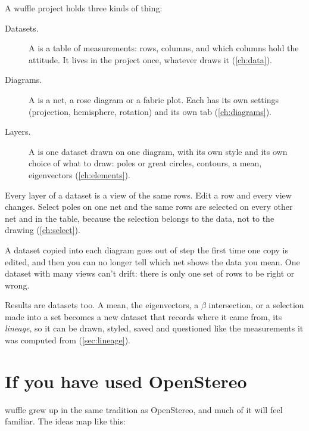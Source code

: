 A wuffle project holds three kinds of thing:

\begin{description}
\item[Datasets.] A  is a table of measurements: rows, columns, and which columns hold the
attitude. It lives in the project once, whatever draws it (\cref{ch:data}).
\item[Diagrams.] A  is a net, a rose diagram or a fabric plot. Each has its own settings
(projection, hemisphere, rotation) and its own tab (\cref{ch:diagrams}).
\item[Layers.] A  is one dataset drawn on one diagram, with its own style and its own choice
of what to draw: poles or great circles, contours, a mean, eigenvectors (\cref{ch:elements}).
\end{description}

Every layer of a dataset is a view of the same rows. Edit a row and every view changes. Select poles
on one net and the same rows are selected on every other net and in the table, because the selection
belongs to the data, not to the drawing (\cref{ch:select}).

\begin{why}
A dataset copied into each diagram goes out of step the first time one copy is edited, and then you
can no longer tell which net shows the data you mean. One dataset with many views can't drift: there is
only one set of rows to be right or wrong.
\end{why}

Results are datasets too. A mean, the eigenvectors, a $\beta$ intersection, or a selection made into a
set becomes a new dataset that records where it came from, its \emph{lineage}, so it can be drawn,
styled, saved and questioned like the measurements it was computed from (\cref{sec:lineage}).

\section{If you have used OpenStereo}\label{sec:openstereo}

wuffle grew up in the same tradition as OpenStereo, and much of it will feel
familiar. The ideas map like this:

